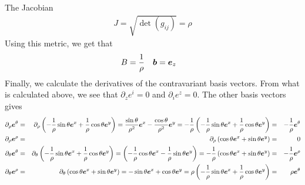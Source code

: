 %
The Jacobian
%
\begin{align*}
    J=\sqrt{\det(g_{ij})}=\rho
\end{align*}
%
Using this metric, we get that
%
\begin{align*}
    &B = \frac{1}{\rho}&
    & \boldsymbol{b}= \boldsymbol{e}_z
\end{align*}
%
Finally, we calculate the derivatives of the contravariant basis vectors.
From what is calculated above, we see that $\partial_z e^i=0$ and $\partial_i e^z=0$.
The other basis vectors gives
%
\begin{align*}
    \partial_\rho \boldsymbol{e}^\theta
    &=&
    \partial_\rho
    \left( - \frac{1}{\rho} \sin\theta \boldsymbol{e}^x
        + \frac{1}{\rho} \cos\theta \boldsymbol{e}^y \right)
    =
        \frac{\sin\theta}{\rho^2} \boldsymbol{e}^x
        - \frac{\cos\theta}{\rho^2} \boldsymbol{e}^y
    =
    - \frac{1}{\rho}
    \left( - \frac{1}{\rho} \sin\theta \boldsymbol{e}^x
        + \frac{1}{\rho} \cos\theta \boldsymbol{e}^y \right)
    &=&
    - \frac{1}{\rho} \boldsymbol{e}^\theta
    \\
    \partial_\rho \boldsymbol{e}^\rho
    &=&
    \partial_\rho
    \left( \cos\theta \boldsymbol{e}^x
        + \sin\theta \boldsymbol{e}^y \right)
    &=&
    0
    \\
    \partial_\theta \boldsymbol{e}^\theta
    &=&
    \partial_\theta
    \left( - \frac{1}{\rho} \sin\theta \boldsymbol{e}^x
        + \frac{1}{\rho} \cos\theta \boldsymbol{e}^y \right)
    =
    \left( - \frac{1}{\rho} \cos\theta \boldsymbol{e}^x
        - \frac{1}{\rho} \sin\theta \boldsymbol{e}^y \right)
    =
    - \frac{1}{\rho}
    \left( \cos\theta \boldsymbol{e}^x
        + \sin\theta \boldsymbol{e}^y \right)
    &=&
    - \frac{1}{\rho}
    \boldsymbol{e}^\rho
    \\
    \partial_\theta \boldsymbol{e}^\rho
    &=&
    \partial_\theta
    \left( \cos\theta \boldsymbol{e}^x
        + \sin\theta \boldsymbol{e}^y \right)
    =
        - \sin\theta \boldsymbol{e}^x
        + \cos\theta \boldsymbol{e}^y
    =
    \rho
    \left( - \frac{1}{\rho} \sin\theta \boldsymbol{e}^x
        + \frac{1}{\rho} \cos\theta \boldsymbol{e}^y \right)
    &=&
    \rho
    \boldsymbol{e}^\theta
\end{align*}
%

